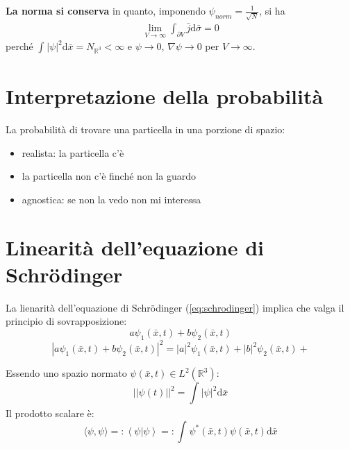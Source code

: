 \textbf{La norma si conserva} in quanto, imponendo $\psi_{norm}=\frac{1}{\sqrt{N}}$, si ha
\begin{equation}\begin{split}
\lim_{V\rightarrow \infty}{\int_{\partial V}^{}{\bar j \textrm{d}\bar \sigma}}=0
\end{split}\end{equation}
perché $\int_{}^{}{|\psi|^2 \textrm{d}\bar x}=N_{\mathbb{R}^3}<\infty$ e $\psi\rightarrow 0$, $\nabla\psi\rightarrow 0$ per $V\rightarrow \infty$.

\section{Interpretazione della probabilità} %
La probabilità di trovare una particella in una porzione di spazio:
\begin{itemize}
\item realista: la particella c'è
\item la particella non c'è finché non la guardo
\item agnostica: se non la vedo non mi interessa
\end{itemize}

\section{Linearità dell'equazione di Schrödinger} %
La lienarità dell'equazione di Schrödinger (\ref{eq:schrodinger}) implica che valga il principio di sovrapposizione:
\begin{equation}
a\psi _1\left(\bar x,t\right)+b\psi _2\left(\bar x,t\right)
\end{equation}
\begin{equation}
|a\psi _1\left(\bar x,t\right)+b\psi _2\left(\bar x,t\right)|^2=|a|^2\psi _1\left(\bar x,t\right)+|b|^2\psi _2\left(\bar x,t\right)+
\end{equation}

Essendo uno spazio normato $\psi \left(\bar x,t\right)\in L^2\left(\mathbb{R} ^3\right)$:
\begin{equation}
||\psi \left(t\right)||^2=\int_{}^{}{|\psi |^2 \textrm{d}\bar x}
\end{equation}
Il prodotto scalare è:
\begin{equation}
\langle \psi ,\psi \rangle=:\left \langle\psi |\psi  \right\rangle=:\int_{}^{}{\psi ^*\left(\bar x,t\right)\psi \left(\bar x,t\right) \textrm{d}\bar x}
\end{equation}

